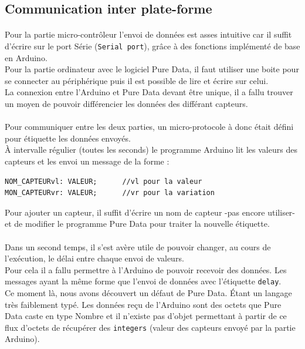 \documentclass[a4paper, titlepage, oneside, 12pt]{article}%
\begin{document}
\subsection{Communication inter plate-forme}
\paragraph{}
Pour la partie micro-contrôleur l'envoi de données est asses intuitive car il suffit d’écrire sur le port Série (\texttt{Serial port}), grâce à des fonctions implémenté de base en Arduino.\\
Pour la partie ordinateur avec le logiciel Pure Data, il faut utiliser une boite pour se connecter au périphérique puis il est possible de lire et écrire sur celui.\\
La connexion entre l'Arduino et Pure Data devant être unique, il a fallu trouver un moyen de pouvoir différencier les données des différant capteurs. 

\paragraph{}
Pour communiquer entre les deux parties, un micro-protocole à donc était défini pour étiquette les données envoyés.\\
À intervalle régulier (toutes les seconds) le programme Arduino lit les valeurs des capteurs et les envoi un message de la forme :
\begin{lstlisting}
NOM_CAPTEURvl: VALEUR;		//vl pour la valeur
MON_CAPTEURvr: VALEUR;		//vr pour la variation
\end{lstlisting}

Pour ajouter un capteur, il suffit d'écrire un nom de capteur -pas encore utiliser- et de modifier le programme Pure Data pour traiter la nouvelle étiquette.

\paragraph{}
Dans un second temps, il s'est avère utile de pouvoir changer, au cours de l’exécution, le délai entre chaque envoi de valeurs. \\
Pour cela il a fallu permettre à l'Arduino de pouvoir recevoir des données. Les messages ayant la même forme que l'envoi de données avec l'étiquette \texttt{delay}.\\
Ce moment là, nous avons découvert un défaut de Pure Data. Étant un langage très faiblement typé. Les données reçu de l'Arduino sont des octets que Pure Data caste en type Nombre et il n'existe pas d'objet permettant à partir de ce flux d'octets de récupérer des \texttt{integers} (valeur des capteurs envoyé par la partie Arduino).\\
\end{document}
